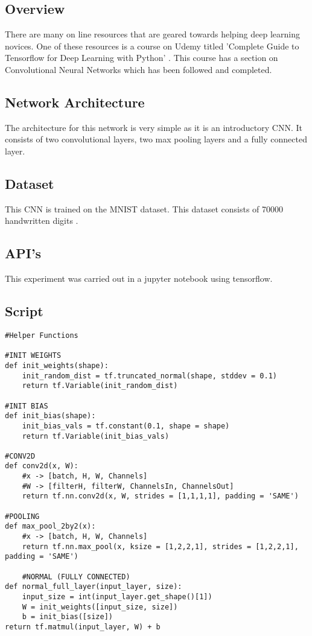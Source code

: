 \subsection*{Overview}
There are many on line resources that are geared towards helping deep learning novices.
One of these resources is a course on Udemy titled 'Complete Guide to Tensorflow for Deep Learning with Python' \textcite{udemy}.
This course has a section on Convolutional Neural Networks which has been followed and completed.

\subsection*{Network Architecture}
The architecture for this network is very simple as it is an introductory CNN.
It consists of two convolutional layers, two max pooling layers and a fully connected layer.

\subsection*{Dataset}
This CNN is trained on the MNIST dataset.
This dataset consists of 70000 handwritten digits \textcite{mnist}.

\subsection*{API's}
This experiment was carried out in a jupyter notebook using tensorflow.

\subsection*{Script}
\begin{lstlisting}
#Helper Functions

#INIT WEIGHTS
def init_weights(shape):
    init_random_dist = tf.truncated_normal(shape, stddev = 0.1)
    return tf.Variable(init_random_dist)

#INIT BIAS
def init_bias(shape):
    init_bias_vals = tf.constant(0.1, shape = shape)
    return tf.Variable(init_bias_vals)

#CONV2D
def conv2d(x, W):
    #x -> [batch, H, W, Channels]
    #W -> [filterH, filterW, ChannelsIn, ChannelsOut]
    return tf.nn.conv2d(x, W, strides = [1,1,1,1], padding = 'SAME')

#POOLING
def max_pool_2by2(x):
    #x -> [batch, H, W, Channels]
    return tf.nn.max_pool(x, ksize = [1,2,2,1], strides = [1,2,2,1], padding = 'SAME')

    #NORMAL (FULLY CONNECTED)
def normal_full_layer(input_layer, size):
    input_size = int(input_layer.get_shape()[1])
    W = init_weights([input_size, size])
    b = init_bias([size])
return tf.matmul(input_layer, W) + b
\end{lstlisting}

